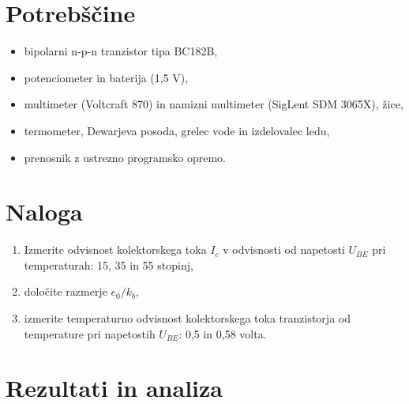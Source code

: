 \documentclass[12pt]{article}
\begin{document}
\section{Potrebščine}

\begin{itemize}
    \item bipolarni n-p-n tranzistor tipa BC182B,
    \item potenciometer in baterija (1,5 V),
    \item multimeter (Voltcraft 870) in namizni multimeter (SigLent SDM 3065X), žice,
    \item termometer, Dewarjeva posoda, grelec vode in izdelovalec ledu,
    \item prenosnik z ustrezno programsko opremo.
\end{itemize}

\section{Naloga}

\begin{enumerate}
    \item Izmerite odvisnost kolektorskega toka $I_c$ v odvisnosti od napetosti $U_{BE}$ pri temperaturah: 15, 35 in 55 stopinj,
    \item določite razmerje $e_0/k_b$,
    \item izmerite temperaturno odvisnost kolektorskega toka tranzistorja od temperature pri napetostih $U_{BE}$: 0,5 in 0,58 volta.
\end{enumerate}


\section{Rezultati in analiza}
\end{document}
